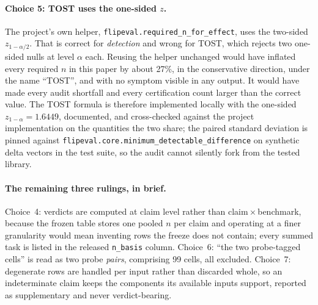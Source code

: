 \paragraph{Choice 5: TOST uses the one-sided $z$.}
The project's own helper, \texttt{flipeval.required\_n\_for\_effect}, uses the
two-sided $z_{1-\alpha/2}$. That is correct for \emph{detection} and wrong for
TOST, which rejects two one-sided nulls at level $\alpha$ each. Reusing the
helper unchanged would have inflated every required $n$ in this paper by about
27\%, in the conservative direction, under the name ``TOST'', and with no
symptom visible in any output. It would have made every audit shortfall and
every certification count larger than the correct value. The TOST formula is
therefore implemented locally with the one-sided $z_{1-\alpha} = 1.6449$,
documented, and cross-checked against the project implementation on the
quantities the two share; the paired standard deviation is pinned against
\texttt{flipeval.core.minimum\_detectable\_difference} on synthetic delta vectors
in the test suite, so the audit cannot silently fork from the tested library.

\paragraph{The remaining three rulings, in brief.}
Choice~4: verdicts are computed at claim level rather than
claim\,$\times$\,benchmark, because the frozen table stores one pooled $n$ per
claim and operating at a finer granularity would mean inventing rows the freeze
does not contain; every summed task is listed in the released
\texttt{n\_basis} column. Choice~6: ``the two probe-tagged cells'' is read as
two probe \emph{pairs}, comprising 99 cells, all excluded. Choice~7: degenerate
rows are handled per input rather than discarded whole, so an indeterminate
claim keeps the components its available inputs support, reported as
supplementary and never verdict-bearing.

